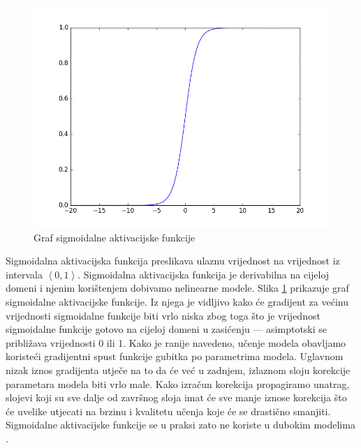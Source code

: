 \documentclass[times, utf8, diplomski, numeric]{fer}
\begin{document}
\begin{figure}[H]
\centering
\includegraphics[scale=0.5]{images/sigmoid_graph.png}
\caption{Graf sigmoidalne aktivacijske funkcije}
\label{img:sigmoid_graph}
\end{figure}

\noindent Sigmoidalna aktivacijska funkcija preslikava ulaznu vrijednost na vrijednost iz intervala $\left< 0, 1\right>$. Sigmoidalna aktivacijska funkcija je derivabilna na cijeloj domeni i njenim korištenjem dobivamo nelinearne modele. 
Slika \ref{img:sigmoid_graph} prikazuje graf sigmoidalne aktivacijske funkcije. 
Iz njega je vidljivo kako će gradijent za većinu vrijednosti sigmoidalne funkcije biti vrlo niska zbog toga što je vrijednost sigmoidalne funkcije gotovo na cijeloj domeni u zasićenju  — asimptotski se približava vrijednosti 0 ili 1.
Kako je ranije navedeno, učenje modela obavljamo koristeći gradijentni spust funkcije gubitka po parametrima modela. 
Uglavnom nizak iznos gradijenta utječe na to da će već u zadnjem, izlaznom sloju korekcije parametara modela biti vrlo male. 
Kako izračun korekcija propagiramo unatrag, slojevi koji su sve dalje od završnog sloja imat će sve manje iznose korekcija što će uvelike utjecati na brzinu i kvalitetu učenja koje će se drastično smanjiti.
Sigmoidalne aktivacijske funkcije se u praksi zato ne koriste u dubokim modelima \citep{seminar:rela}.
\end{document}
